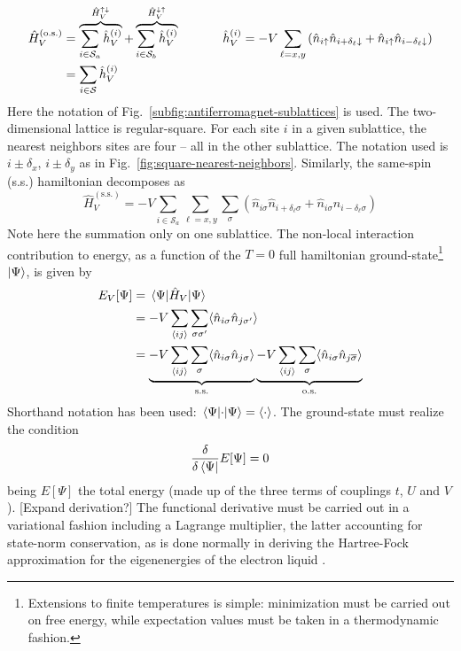 \[
	\begin{aligned}
		\hat H_V^{(\mathrm{o.s.})} &= \overbrace{
			\sum_{i \in \mathcal{S}_a} \hat h_V^{(i)}
		}^{\hat H_V^{\uparrow\downarrow}} + \overbrace{
			\sum_{i \in \mathcal{S}_b} \hat h_V^{(i)}
		}^{\hat H_V^{\downarrow\uparrow}} \hspace{0.1\textwidth}
		\hat h_V^{(i)} = -V \sum_{\ell = x,y} \left(
		\hat n_{i\uparrow} \hat n_{i+\delta_\ell \downarrow} + \hat n_{i\uparrow} \hat n_{i-\delta_\ell \downarrow} 
		\right)  \\
		&= \sum_{i \in \mathcal{S}} \hat h_V^{(i)}
	\end{aligned}
\]
Here the notation of Fig.~\ref{subfig:antiferromagnet-sublattices} is used. The two-dimensional lattice is regular-square. For each site $i$ in a given sublattice, the nearest neighbors sites are four -- all in the other sublattice. The notation used is $i \pm \delta_x$, $i \pm  \delta_y$ as in Fig.~\ref{fig:square-nearest-neighbors}. Similarly, the same-spin (s.s.) hamiltonian decomposes as
\[
	\hat H_V^{(\mathrm{s.s.})} = -V \sum_{i \in \mathcal{S}_a} \sum_{\ell = x,y} \sum_\sigma \left(
		\hat n_{i\sigma} \hat n_{i + \delta_\ell \sigma} + \hat n_{i\sigma} \hat n_{i - \delta_\ell \sigma} 
	\right) 
\]
Note here the summation only on one sublattice. 
The non-local interaction contribution to energy, as a function of the $T=0$ full hamiltonian ground-state\footnote{
	Extensions to finite temperatures is simple: minimization must be carried out on free energy, while expectation values must be taken in a thermodynamic fashion.
} $\ket{\Psi}$, is given by
\[
\begin{aligned}
	E_V [\Psi] &= \mel{\Psi}{\hat H_V}{\Psi} \\
	&= -V \sum_{\ev{ij}} \sum_{\sigma\sigma'} \langle
		\hat n_{i\sigma} \hat n_{j\sigma'}
	\rangle \\
	&= \underbrace{
		-V \sum_{\ev{ij}} \sum_{\sigma} \langle
			\hat n_{i\sigma} \hat n_{j\sigma}
		\rangle
	}_{\mathrm{s.s.}} \underbrace{
		-V \sum_{\ev{ij}} \sum_{\sigma} \langle
			\hat n_{i\sigma} \hat n_{j\overline{\sigma}}
		\rangle
	}_{\mathrm{o.s.}}
\end{aligned}
\]
Shorthand notation has been used: $\mel{\Psi}{\cdot}{\Psi} = \langle \cdot \rangle$. 
The ground-state must realize the condition
\[
\fdv{}{\bra{\Psi}} E[\Psi] = 0
\]
being $E[\Psi]$ the total energy (made up of the three terms of couplings $t$, $U$ and $V$). {\color{tabred}[Expand derivation?]} The functional derivative must be carried out in a variational fashion including a Lagrange multiplier, the latter accounting for state-norm conservation, as is done normally in deriving the Hartree-Fock approximation for the eigenenergies of the electron liquid \cite{grosso2014solid, giuliani2005quantum}. 

